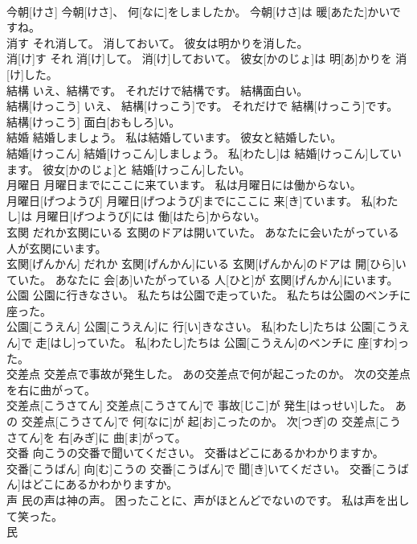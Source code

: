 \documentclass[8pt]{extreport}
\begin{document}
\begin{CJK}{UTF8}{min}
\\	今朝[けさ] 今朝[けさ]、 何[なに]をしましたか。 今朝[けさ]は 暖[あたた]かいですね。
\\	消す それ消して。 消しておいて。 彼女は明かりを消した。	
\\	消[け]す それ 消[け]して。 消[け]しておいて。 彼女[かのじょ]は 明[あ]かりを 消[け]した。
\\	結構 いえ、結構です。 それだけで結構です。 結構面白い。	
\\	結構[けっこう] いえ、 結構[けっこう]です。 それだけで 結構[けっこう]です。 結構[けっこう] 面白[おもしろ]い。
\\	結婚 結婚しましょう。 私は結婚しています。 彼女と結婚したい。	
\\	結婚[けっこん] 結婚[けっこん]しましょう。 私[わたし]は 結婚[けっこん]しています。 彼女[かのじょ]と 結婚[けっこん]したい。
\\	月曜日 月曜日までにここに来ています。 私は月曜日には働からない。	
\\	月曜日[げつようび] 月曜日[げつようび]までにここに 来[き]ています。 私[わたし]は 月曜日[げつようび]には 働[はたら]からない。
\\	玄関 だれか玄関にいる 玄関のドアは開いていた。 あなたに会いたがっている 人が玄関にいます。	
\\	玄関[げんかん] だれか 玄関[げんかん]にいる 玄関[げんかん]のドアは 開[ひら]いていた。 あなたに 会[あ]いたがっている 人[ひと]が 玄関[げんかん]にいます。
\\	公園 公園に行きなさい。 私たちは公園で走っていた。 私たちは公園のベンチに座った。	
\\	公園[こうえん] 公園[こうえん]に 行[い]きなさい。 私[わたし]たちは 公園[こうえん]で 走[はし]っていた。 私[わたし]たちは 公園[こうえん]のベンチに 座[すわ]った。
\\	交差点 交差点で事故が発生した。 あの交差点で何が起こったのか。 次の交差点を右に曲がって。	
\\	交差点[こうさてん] 交差点[こうさてん]で 事故[じこ]が 発生[はっせい]した。 あの 交差点[こうさてん]で 何[なに]が 起[お]こったのか。 次[つぎ]の 交差点[こうさてん]を 右[みぎ]に 曲[ま]がって。
\\	交番 向こうの交番で聞いてください。 交番はどこにあるかわかりますか。	
\\	交番[こうばん] 向[む]こうの 交番[こうばん]で 聞[き]いてください。 交番[こうばん]はどこにあるかわかりますか。
\\	声 民の声は神の声。 困ったことに、声がほとんどでないのです。 私は声を出して笑った。	
\\	民

\end{CJK}
\end{document}
